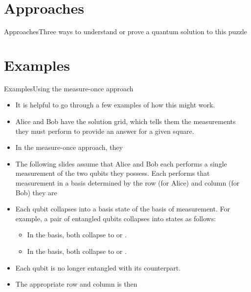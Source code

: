 \section*{Approaches}

\begin{frame}{Approaches}{Three ways to understand or prove a quantum solution to this puzzle}

\end{frame}

\section*{Examples}
\begin{frame}{Examples}{Using the measure-once approach}

\begin{itemize}
    \item It is helpful to go through a few examples of how this might work.
    \item Alice and Bob have the solution grid, which tells them the measurements they must perform to provide an answer for a given square.
    \item In the measure-once approach, they 
    \item The following slides assume that Alice and Bob each performs a single measurement of the two qubits they possess.  Each performs that measurement in a basis determined by the row (for Alice) and column (for Bob) they are 
    \item Each qubit collapses into a basis state of the basis of measurement.  For example, a pair of entangled qubits collapses into states as follows:
    \begin{itemize}
        \item In the \PauliZ{} basis, both collapse to \QZero{} or \QOne{}.
        \item In the \PauliX{} basis, both collapse to \ket{+} or \ket{-}.
    \end{itemize}
    \item Each qubit is no longer entangled with its counterpart.
    \item The appropriate row and column is then 
\end{itemize}
\end{frame}

